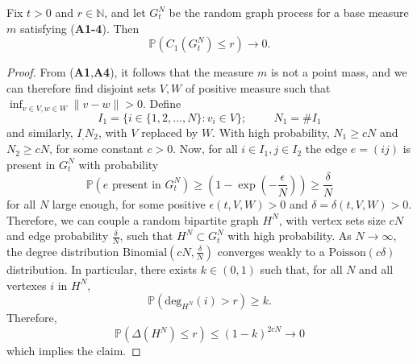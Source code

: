 \begin{lemma}\label{lemma: lower bound on largest cluster} Fix $t>0$ and $r\in \mathbb{N}$, and let $G^N_t$ be the random graph process for a base measure $m$ satisfying (\textbf{A1-4}). Then \begin{equation}
    \mathbb{P}(C_1(G^N_t)\leq r)\rightarrow 0.
\end{equation} \end{lemma} \begin{proof} From (\textbf{A1},\textbf{A4}), it follows that the measure $m$ is not a point mass, and we can therefore find disjoint sets $V, W$ of positive measure such that $\inf_{v \in V, w \in W} \|v-w\|>0$. Define \begin{equation} I_1=\{i \in \{1,2,...,N\}: v_i \in V\}; \hspace{1cm} N_1=\#I_1
\end{equation} and similarly, $I_, N_2$, with $V$ replaced by $W$. With high probability, $N_1\geq cN$ and $N_2\geq cN$, for some constant $c>0$. Now, for all $i\in I_1, j\in I_2$ the edge $e=(ij)$ is present in $G^N_t$ with probability \begin{equation}
    \mathbb{P}(e \text{ present in }G^N_t) \geq \left(1-\exp\left(-\frac{\epsilon}{N}\right)\right) \geq \frac{\delta}{N}
\end{equation} for all $N$ large enough, for some positive $\epsilon(t, V, W)>0$ and $\delta=\delta(t, V, W)>0$. \medskip \\ Therefore, we can couple a random bipartite graph $H^N$, with vertex sets size $cN$ and edge probability $\frac{\delta}{N}$, such that $H^N \subset G^N_t$ with high probability. As $N\rightarrow \infty$, the degree distribution $\text{Binomial}(cN,\frac{\delta}{N})$ converges weakly to a $\text{Poisson}(c\delta)$ distribution. In particular, there exists $k\in (0,1)$ such that, for all $N$ and all vertexes $i$ in $H^N$, \begin{equation}
    \mathbb{P}(\text{deg}_{H^N}(i)>r) \geq k.
\end{equation} Therefore, \begin{equation}
    \mathbb{P}(\Delta(H^N)\le r) \le (1-k)^{2cN} \rightarrow 0
\end{equation} which implies the claim.  \end{proof}

